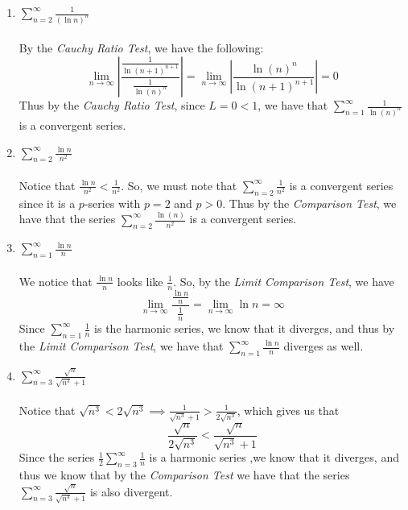 \documentclass[12pt,letterpaper]{article}
\newcommand{\limx}[2]{\displaystyle\lim\limits_{#1 \to #2}}
\newcommand{\abs}[1]{\left\lvert #1 \right\rvert}
\theoremstyle{case}
\theoremstyle{definition}
\begin{document}
\begin{enumerate}
\begin{enumerate}
			\item $\displaystyle\sum_{n=2}^{\infty} \frac{1}{(\ln n)^n}$
			\\\\By the \textit{Cauchy Ratio Test}, we have the following:
			\[\limx{n}{\infty} \abs{\frac{\frac{1}{\ln(n+1)^{n+1}}}{\frac{1}{\ln(n)^n}}}=\limx{n}{\infty} \abs{\frac{\ln(n)^n}{\ln(n+1)^{n+1}}}=0\]
			Thus by the \textit{Cauchy Ratio Test}, since $L=0<1$, we have that $\displaystyle\sum_{n=1}^{\infty}\frac{1}{\ln (n)^n}$ is a convergent series. \\
			
			\item $\displaystyle\sum_{n=2}^{\infty} \frac{\ln n}{n^2}$
			\\\\Notice that $\frac{\ln n}{n^2} < \frac{1}{n^2}$. So, we must note that $\displaystyle\sum_{n=2}^{\infty} \frac{1}{n^2}$ is a convergent series since it is a $p$-series with $p=2$ and $p>0$. Thus by the \textit{Comparison Test}, we have that the series $\displaystyle\sum_{n=2}^{\infty} \frac{\ln (n)}{n^2}$  is a convergent series.\\
			
			\item $\displaystyle\sum_{n=1}^{\infty} \frac{\ln n}{n}$
			\\\\We notice that $\frac{\ln n}{n}$ looks like $\frac{1}{n}$. So, by the \textit{Limit Comparison Test}, we have
			\[\limx{n}{\infty}\frac{\frac{\ln n}{n}}{\frac{1}{n}}= \limx{n}{\infty} \ln n = \infty\]
			Since $\displaystyle\sum_{n=1}^{\infty} \frac{1}{n}$ is the harmonic series, we know that it diverges, and thus by the \textit{Limit Comparison Test}, we have that $\displaystyle\sum_{n=1}^{\infty} \frac{\ln n}{n}$ diverges as well.\\
			
			\item $\displaystyle\sum_{n=3}^{\infty} \frac{\sqrt{n}}{\sqrt{n^3}+1}$
			\\\\Notice that $\sqrt{n^3} < 2\sqrt{n^3} \implies \frac{1}{\sqrt{n^3}+1} > \frac{1}{2\sqrt{n^3}}$, which gives us that
			\[\frac{\sqrt{n}}{2\sqrt{n^3}}<\frac{\sqrt{n}}{\sqrt{n^3}+1}\]
			Since the series $\displaystyle \frac{1}{2}\sum_{n=3}^{\infty} \frac{1}{n}$ is a harmonic series ,we know that it diverges, and thus we know that by the \textit{Comparison Test} we have that the series $\displaystyle\sum_{n=3}^{\infty} \frac{\sqrt{n}}{\sqrt{n^3}+1}$ is also divergent.\\
			

\end{enumerate}
\end{enumerate}
\end{document}
